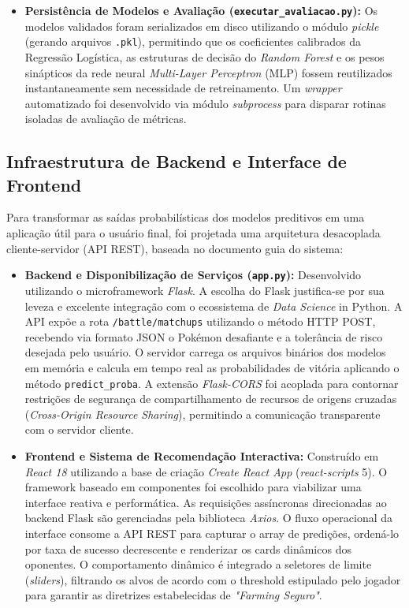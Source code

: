 \documentclass[12pt, a4paper]{article}
\begin{document}
\begin{itemize}
    \item \textbf{Persistência de Modelos e Avaliação (\texttt{executar\_avaliacao.py}):} Os modelos validados foram serializados em disco utilizando o módulo \textit{pickle} (gerando arquivos \texttt{.pkl}), permitindo que os coeficientes calibrados da Regressão Logística, as estruturas de decisão do \textit{Random Forest} e os pesos sinápticos da rede neural \textit{Multi-Layer Perceptron} (MLP) fossem reutilizados instantaneamente sem necessidade de retreinamento. Um \textit{wrapper} automatizado foi desenvolvido via módulo \textit{subprocess} para disparar rotinas isoladas de avaliação de métricas.
\end{itemize}

\subsection{Infraestrutura de Backend e Interface de Frontend}

Para transformar as saídas probabilísticas dos modelos preditivos em uma aplicação útil para o usuário final, foi projetada uma arquitetura desacoplada cliente-servidor (API REST), baseada no documento guia do sistema:

\begin{itemize}
    \item \textbf{Backend e Disponibilização de Serviços (\texttt{app.py}):} Desenvolvido utilizando o microframework \textit{Flask}. A escolha do Flask justifica-se por sua leveza e excelente integração com o ecossistema de \textit{Data Science} in Python. A API expõe a rota \texttt{/battle/matchups} utilizando o método HTTP POST, recebendo via formato JSON o Pokémon desafiante e a tolerância de risco desejada pelo usuário. O servidor carrega os arquivos binários dos modelos em memória e calcula em tempo real as probabilidades de vitória aplicando o método \texttt{predict\_proba}. A extensão \textit{Flask-CORS} foi acoplada para contornar restrições de segurança de compartilhamento de recursos de origens cruzadas (\textit{Cross-Origin Resource Sharing}), permitindo a comunicação transparente com o servidor cliente.
    
    \item \textbf{Frontend e Sistema de Recomendação Interactiva:} Construído em \textit{React 18} utilizando a base de criação \textit{Create React App} (\textit{react-scripts} 5). O framework baseado em componentes foi escolhido para viabilizar uma interface reativa e performática. As requisições assíncronas direcionadas ao backend Flask são gerenciadas pela biblioteca \textit{Axios}. O fluxo operacional da interface consome a API REST para capturar o array de predições, ordená-lo por taxa de sucesso decrescente e renderizar os cards dinâmicos dos oponentes. O comportamento dinâmico é integrado a seletores de limite (\textit{sliders}), filtrando os alvos de acordo com o threshold estipulado pelo jogador para garantir as diretrizes estabelecidas de \textit{"Farming Seguro"}.
\end{itemize}
\end{document}
